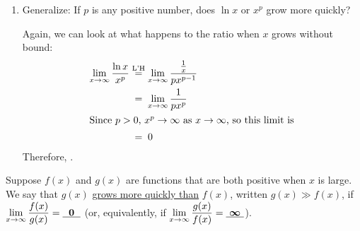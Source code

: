 \documentclass[main]{subfiles}
\begin{document}
\begin{enumerate}
\begin{enumerate}
    \begin{problem}[\vfill]
      How could we use limits to confirm which is larger when $x$ is very
      large? 
    \end{problem}

    \begin{solution}
      We could look at what happens to the ratio $\dfrac{\ln
        x}{\sqrt[3]{x}}$ (or the reciprocal of this) when $x$ gets very
      large.  That is, we look at
      \begin{align*}
        \lim_{x \to \infty} \frac{\ln x}{\sqrt[3]{x}} & \lheq \lim_{x
          \to \infty} \frac{\frac{1}{x}}{\frac{1}{3} x^{-2/3}} \\
        & \nolheq \lim_{x \to \infty} \frac{3}{x^{1/3}} \\
        & \nolheq 0
      \end{align*}
      The fact that this limit is 0 says that, when $x$ is very large,
      $\ln x$ is tiny compared to $\sqrt[3]{x}$.
    \end{solution}

  \item
    \begin{problem}[\vfill\newpage]
      Generalize: If $p$ is any positive number, does $\ln x$ or $x^p$
      grow more quickly?
    \end{problem}

    \begin{solution}
      Again, we can look at what happens to the ratio when $x$ grows
      without bound:
      \begin{align*}
        \lim_{x \to \infty} \frac{\ln x}{x^p} & \lheq \lim_{x \to
          \infty} \frac{\frac{1}{x}}{p x^{p-1}} \\
        & \nolheq \lim_{x \to \infty} \frac{1}{p x^p} \\
        \intertext{Since $p > 0$, $x^p \to \infty$ as $x \to \infty$, so
          this limit is}
        & \nolheq 0
      \end{align*}
      Therefore, .
    \end{solution}

  \end{enumerate}

\end{enumerate}

  \begin{framed}
    Suppose $f(x)$ and $g(x)$ are functions that are both positive when
    $x$ is large.  We say that $g(x)$ \uline{grows more quickly than}
    $f(x)$, written $g(x) \gg f(x)$, if $\displaystyle \lim_{x \to
      \infty} \frac{f(x)}{g(x)} = \cfitb{0.25in}{0}$ (or, equivalently,
    if $\displaystyle \lim_{x \to \infty} \frac{g(x)}{f(x)} =
    \cfitb{0.25in}{\infty}$).
  \end{framed}
\end{document}
